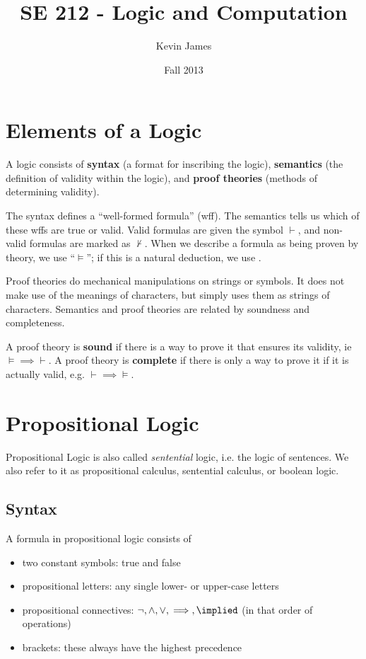 \documentclass[12pt]{article}
\begin{document}
\title{SE 212 - Logic and Computation}
\author{Kevin James}
\date{\vspace{-2ex}Fall 2013}
\maketitle\HRule

\section*{Elements of a Logic}
A logic consists of {\bf syntax} (a format for inscribing the logic), {\bf semantics} (the definition of validity within the logic), and {\bf proof theories} (methods of determining validity).

The syntax defines a ``well-formed formula'' (wff). The semantics tells us which of these wffs are true or valid. Valid formulas are given the symbol $\vdash$, and non-valid formulas are marked as $\not\vdash$. When we describe a formula as being proven by theory, we use ``$\vDash$''; if this is a natural deduction, we use \vDashnd.

Proof theories do mechanical manipulations on strings or symbols. It does not make use of the meanings of characters, but simply uses them as strings of characters. Semantics and proof theories are related by soundness and completeness.

A proof theory is {\bf sound} if there is a way to prove it that ensures its validity, ie $\vDash\implies\vdash$. A proof theory is {\bf complete} if there is only a way to prove it if it is actually valid, e.g. $\vdash\implies\vDash$.

\section*{Propositional Logic}
Propositional Logic is also called {\it sentential} logic, i.e. the logic of sentences. We also refer to it as propositional calculus, sentential calculus, or boolean logic.

\subsection*{Syntax}
A formula in propositional logic consists of
\begin{itemize}
\item two constant symbols: true and false
\item propositional letters: any single lower- or upper-case letters
\item propositional connectives: $\neg, \land, \lor, \implies, \implied$ (in that order of operations)
\item brackets: these always have the highest precedence
\end{itemize}
\end{document}
